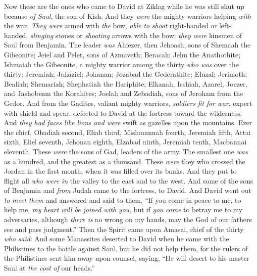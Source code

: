 \begin{biblechapter} %
 Now these are the ones who came to David at Ziklag while he was still shut up because \textit{of Saul}, the son of Kish. And they \textit{were} the mighty warriors helping \textit{with} the war.
\verse \textit{They were} armed with \textit{the} bow, \textit{able to shoot} right-handed or left-handed, \textit{slinging} stones or \textit{shooting} arrows with the bow; \textit{they were} kinsmen of Saul from Benjamin.
\verse The leader \textit{was} Ahiezer, then Jehoash, sons of Shemaah the Gibeonite; Jeiel and Pelet, sons of Azmaveth; Beracah; Jehu the Anathothite;
\verse Ishmaiah the Gibeonite, a mighty warrior among the thirty \textit{who was} over the thirty; Jeremiah; Jahaziel; Johanan; Jozabad the Gederathite;
\verse  Eluzai; Jerimoth; Bealiah; Shemariah; Shephatiah the Hariphite;
\verse Elkanah, Isshiah, Azarel, Joezer, and Jashobeam the Korahites;
\verse Joelah and Zebadiah, sons of Jeroham from the Gedor.
\verse And from the Gadites, valiant mighty warriors, \textit{soldiers fit for war}, expert with shield and spear, defected to David at the fortress toward the wilderness. And \textit{they had faces like lions} \textit{and were} swift as gazelles upon the mountains.
\verse Ezer the chief, Obadiah second, Eliab third,
\verse Mishmannah fourth, Jeremiah fifth,
\verse Attai sixth, Eliel seventh,
\verse Jehonan eighth, Elzabad ninth,
\verse Jeremiah tenth, Macbannai eleventh.
\verse These \textit{were} the sons of Gad, leaders of the army. The smallest one \textit{was} as a hundred, and the greatest as a thousand.
\verse These \textit{were} they who crossed the Jordan in the first month, when it was filled over its banks. And they put to flight all \textit{who were in} the valley to the east and to the west.
\verse And some of the sons of Benjamin and \textit{from} Judah came to the fortress, to David.
\verse And David went out \textit{to meet them} and answered and said to them, “If you come in peace to me, to help me, \textit{my heart will be joined with you}, but if \textit{you come} to betray me to my adversaries, although \textit{there is} no wrong on my hands, may the God of our fathers see and pass judgment.”
\verse Then the Spirit came upon Amasai, chief of the thirty \textit{who said}:
\verse And some Manassites deserted to David when he came with the Philistines to the battle against Saul, but he did not help them, for the rulers of the Philistines sent him away upon counsel, saying, “He will desert to his master Saul at \textit{the cost of} our heads.”

\end{biblechapter}
